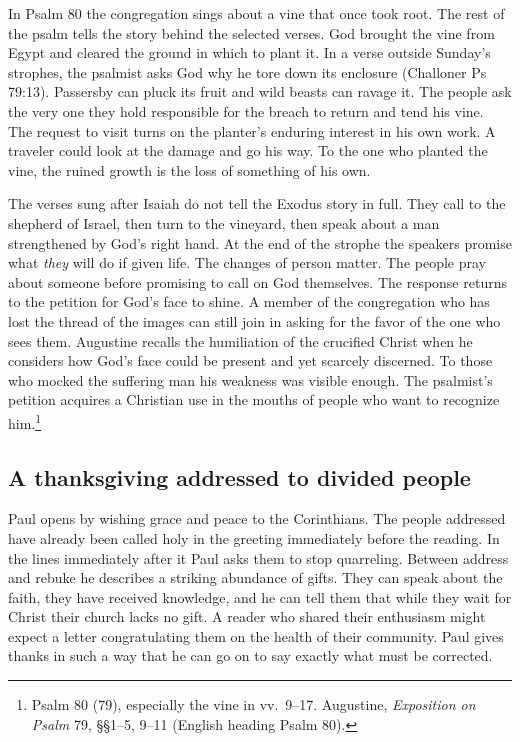In Psalm 80 the congregation sings about a vine that once took root. The rest of the psalm tells the story behind the selected verses. God brought the vine from Egypt and cleared the ground in which to plant it. In a verse outside Sunday's strophes, the psalmist asks God why he tore down its enclosure (Challoner Ps 79:13). Passersby can pluck its fruit and wild beasts can ravage it. The people ask the very one they hold responsible for the breach to return and tend his vine. The request to visit turns on the planter's enduring interest in his own work. A traveler could look at the damage and go his way. To the one who planted the vine, the ruined growth is the loss of something of his own.

The verses sung after Isaiah do not tell the Exodus story in full. They call to the shepherd of Israel, then turn to the vineyard, then speak about a man strengthened by God's right hand. At the end of the strophe the speakers promise what \emph{they} will do if given life. The changes of person matter. The people pray about someone before promising to call on God themselves. The response returns to the petition for God's face to shine. A member of the congregation who has lost the thread of the images can still join in asking for the favor of the one who sees them. Augustine recalls the humiliation of the crucified Christ when he considers how God's face could be present and yet scarcely discerned. To those who mocked the suffering man his weakness was visible enough. The psalmist's petition acquires a Christian use in the mouths of people who want to recognize him.\footnote{Psalm 80 (79), especially the vine in vv.~9--17. Augustine, \textit{Exposition on Psalm} 79, §§1--5, 9--11 (English heading Psalm 80).}

\subsection{A thanksgiving addressed to divided people}

Paul opens by wishing grace and peace to the Corinthians. The people addressed have already been called holy in the greeting immediately before the reading. In the lines immediately after it Paul asks them to stop quarreling. Between address and rebuke he describes a striking abundance of gifts. They can speak about the faith, they have received knowledge, and he can tell them that while they wait for Christ their church lacks no gift. A reader who shared their enthusiasm might expect a letter congratulating them on the health of their community. Paul gives thanks in such a way that he can go on to say exactly what must be corrected.

